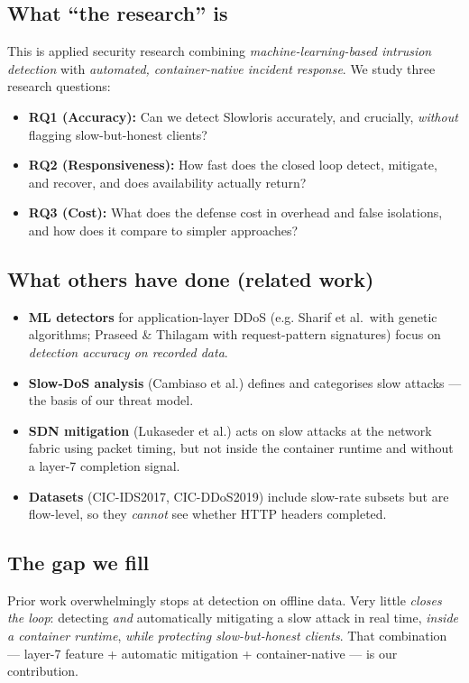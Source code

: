\documentclass[11pt,a4paper]{article}
\begin{document}
\subsection{What ``the research'' is}
This is applied security research combining \emph{machine-learning-based intrusion
detection} with \emph{automated, container-native incident response}. We study
three research questions:
\begin{itemize}
  \item \textbf{RQ1 (Accuracy):} Can we detect Slowloris accurately, and crucially,
  \emph{without} flagging slow-but-honest clients?
  \item \textbf{RQ2 (Responsiveness):} How fast does the closed loop detect,
  mitigate, and recover, and does availability actually return?
  \item \textbf{RQ3 (Cost):} What does the defense cost in overhead and false
  isolations, and how does it compare to simpler approaches?
\end{itemize}

\subsection{What others have done (related work)}
\begin{itemize}
  \item \textbf{ML detectors} for application-layer DDoS (e.g. Sharif et al.\ with
  genetic algorithms; Praseed \& Thilagam with request-pattern signatures) focus on
  \emph{detection accuracy on recorded data}.
  \item \textbf{Slow-DoS analysis} (Cambiaso et al.) defines and categorises slow
  attacks --- the basis of our threat model.
  \item \textbf{SDN mitigation} (Lukaseder et al.) acts on slow attacks at the
  network fabric using packet timing, but not inside the container runtime and
  without a layer-7 completion signal.
  \item \textbf{Datasets} (CIC-IDS2017, CIC-DDoS2019) include slow-rate subsets but
  are flow-level, so they \emph{cannot} see whether HTTP headers completed.
\end{itemize}

\subsection{The gap we fill}
Prior work overwhelmingly stops at detection on offline data. Very little
\emph{closes the loop}: detecting \emph{and} automatically mitigating a slow attack
in real time, \emph{inside a container runtime}, \emph{while protecting
slow-but-honest clients}. That combination --- layer-7 feature + automatic
mitigation + container-native --- is our contribution.
\end{document}
